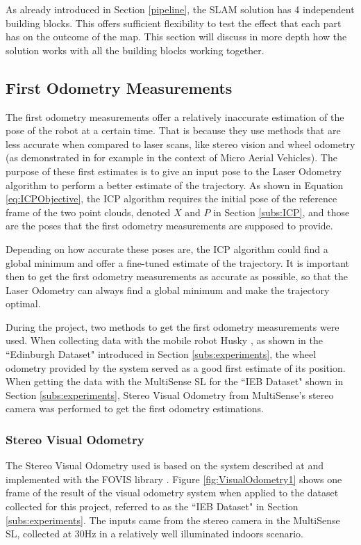 \documentclass[11pt]{article}
\begin{document}
As already introduced in Section \ref{pipeline}, the SLAM solution has 4 independent building blocks. This offers sufficient flexibility to test the effect that each part has on the outcome of the map. This section will discuss in more depth how the solution works with all the building blocks working together. 
	 
	\subsection{First Odometry Measurements}

The first odometry measurements offer a relatively inaccurate estimation of the pose of the robot at a certain time. That is because they use methods that are less accurate when compared to laser scans, like stereo vision and wheel odometry (as demonstrated in \cite{achtelik2009stereo} for example in the context of Micro Aerial Vehicles). The purpose of these first estimates is to give an input pose to the Laser Odometry algorithm to perform a better estimate of the trajectory. As shown in Equation \ref{eq:ICPObjective}, the ICP algorithm requires the initial pose of the reference frame of the two point clouds, denoted $X$ and $P$ in Section \ref{subs:ICP}, and those are the poses that the first odometry measurements are supposed to provide.

Depending on how accurate these poses are, the ICP algorithm could find a global minimum and offer a fine-tuned estimate of the trajectory. It is important then to get the first odometry measurements as accurate as possible, so that the Laser Odometry can always find a global minimum and make the trajectory optimal.
	
During the project, two methods to get the first odometry measurements were used. When collecting data with the mobile robot Husky \cite{Husky}, as shown in the ``Edinburgh Dataset" introduced in Section \ref{subs:experiments}, the wheel odometry provided by the system served as a good first estimate of its position. When getting the data with the MultiSense SL \cite{multisense} for the ``IEB Dataset" shown in Section \ref{subs:experiments}, Stereo Visual Odometry from MultiSense's stereo camera was performed to get the first odometry estimations.
	
	\subsubsection*{Stereo Visual Odometry}

The Stereo Visual Odometry used is based on the system described at \cite{VisualOdometry} and implemented with the FOVIS library \cite{fovis}. Figure \ref{fig:VisualOdometry1} shows one frame of the result of the visual odometry system when applied to the dataset collected for this project, referred to as the ``IEB Dataset" in Section \ref{subs:experiments}. The inputs came from the stereo camera in the MultiSense SL, collected at 30Hz in a relatively well illuminated indoors scenario.
	
\end{document}
